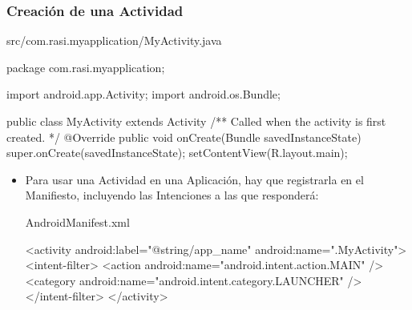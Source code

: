 \documentclass[hyperref={pdfpagelabels=true},ucs]{beamer}
\begin{document}
\begin{frame}[fragile,shrink=25]
\frametitle{Creación de una Actividad}

\begin{scriptsize}
\begin{block}{src/com.rasi.myapplication/MyActivity.java}
\begin{java}
  package com.rasi.myapplication;

  import android.app.Activity; 
  import android.os.Bundle;

  public class MyActivity extends Activity { 
    /** Called when the activity is first created. */ 
    @Override 
    public void onCreate(Bundle savedInstanceState) { 
      super.onCreate(savedInstanceState);
      setContentView(R.layout.main);
    }
  }
\end{java}
\end{block}
\end{scriptsize}

\begin{itemize}
\item Para usar una Actividad en una Aplicación, hay que registrarla
  en el \alert{Manifiesto}, incluyendo las Intenciones a las que responderá:
\begin{scriptsize}
\begin{block}{AndroidManifest.xml}
\begin{xml}
<activity android:label="@string/app_name"
          android:name=".MyActivity">
  <intent-filter>
    <action android:name="android.intent.action.MAIN" />
    <category android:name="android.intent.category.LAUNCHER" />
  </intent-filter>
</activity>
\end{xml}
\end{block}
\end{scriptsize}

\end{itemize}


\end{frame}
\end{document}
